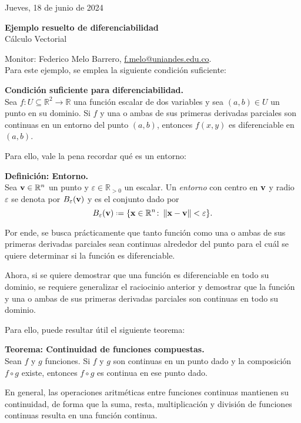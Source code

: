 \documentclass{fmbvecto}
\renewcommand{\title}{Ejemplo resuelto de diferenciabilidad}
\newcommand{\subject}{Cálculo Vectorial}
\begin{document}
Jueves, 18 de junio de 2024

\begin{center}
    \textbf{\LARGE \title} \\
    {\large \subject}
\end{center}

Monitor: Federico Melo Barrero, \href{mailto:f.melo@uniandes.edu.co}{f.melo@uniandes.edu.co}.\\

Para este ejemplo, se emplea la siguiente condición suficiente:

\begin{gbox}
    \textbf{Condición suficiente para diferenciabilidad.}\\
    Sea \(f\colon U\subseteq \mathbb{R}^{2}\to\mathbb{R}\) una función escalar de dos variables y sea \((a,b)\in U\) un punto en su dominio. Si \(f\) y una o ambas de sus primeras derivadas parciales son continuas en un entorno del punto \((a,b)\), entonces  \(f(x,y)\) es diferenciable en \((a,b)\).
\end{gbox}

Para ello, vale la pena recordar qué es un entorno:

\begin{gbox}
    \textbf{Definición: Entorno.}\\
    Sea \(\boldsymbol{{\mathbf{v}}}\in\mathbb{R}^{n}\) un punto y \(\varepsilon \in \mathbb{R}_{>0}\) un escalar. Un \emph{entorno} con centro en \(\boldsymbol{{\mathbf{v}}}\) y radio \(\varepsilon\) se denota por \(B_{\varepsilon}(\boldsymbol{{\mathbf{v}}})\) y es el conjunto dado por
        \[
          B_{\varepsilon}(\bvec{v}) \coloneqq \{\bvec{x}\in\mathbb{R}^{n}\colon\norm{\bvec{x}-\bvec{v}} < \varepsilon\}.
        \]
\end{gbox}

Por ende, se busca prácticamente que tanto función como una o ambas de sus primeras derivadas parciales sean continuas alrededor del punto para el cuál se quiere determinar si la función es diferenciable.

Ahora, si se quiere demostrar que una función es diferenciable en todo su dominio, se requiere generalizar el raciocinio anterior y demostrar que la función y una o ambas de sus primeras derivadas parciales son continuas en todo su dominio.

Para ello, puede resultar útil el siguiente teorema:
\begin{gbox}
    \textbf{Teorema: Continuidad de funciones compuestas.}\\
    Sean \(f\) y \(g\) funciones. Si \(f\) y \(g\) son continuas en un punto dado y la composición \(f \circ g\) existe, entonces \(f \circ g\) es continua en ese punto dado.
\end{gbox}
En general, las operaciones aritméticas entre funciones continuas mantienen su continuidad, de forma que la suma, resta, multiplicación y división de funciones continuas resulta en una función continua.
\end{document}
